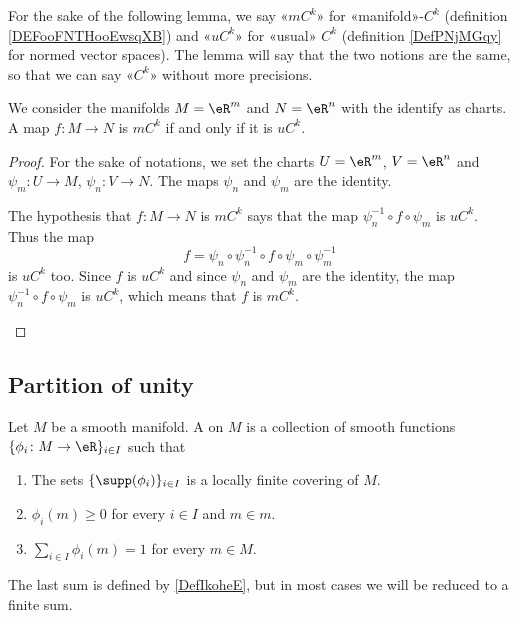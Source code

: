 For the sake of the following lemma, we say «\( mC^k\)» for «manifold»-\( C^k\) (definition \ref{DEFooFNTHooEwsqXB}) and «\( uC^k\)» for «usual» \( C^k\) (definition \ref{DefPNjMGqy} for normed vector spaces). The lemma will say that the two notions are the same, so that we can say «\( C^k\)» without more precisions.
\begin{lemma}			\label{LEMooXGFXooBcmIbK}
	We consider the manifolds \( M=\eR^m\) and \( N=\eR^n\) with the identify as charts. A map \( f\colon M\to N\) is \( mC^k\) if and only if it is \( uC^k\).
\end{lemma}

\begin{proof}
	For the sake of notations, we set the charts \( U=\eR^m\), \( V=\eR^n\) and \( \psi_m\colon U\to M\), \( \psi_n\colon V\to N\). The maps \( \psi_n\) and \( \psi_m\) are the identity.
	\begin{subproof}
		\spitem[\( \Rightarrow\)]
		The hypothesis that \( f\colon M\to N\) is \( mC^k\) says that the map \( \psi_n^{-1}\circ f\circ\psi_m\) is \( uC^k\). Thus the map
		\begin{equation}
			f=\psi_n\circ\psi_n^{-1}\circ f\circ\psi_m\circ\psi_m^{-1}
		\end{equation}
		is \( uC^k\) too.
		\spitem[\( \Leftarrow\)]
		Since \( f\) is \( uC^k\) and since \( \psi_n\) and \( \psi_m\) are the identity, the map \( \psi_n^{-1}\circ f\circ\psi_m\) is \( uC^k\), which means that \( f\) is \( mC^k\).
	\end{subproof}
\end{proof}


\subsection{Partition of unity}

\begin{definition}			\label{DEFooGEAJooInejRf}
	Let \( M\) be a smooth manifold. A  on \( M\) is a collection of smooth functions \( \{\phi_i \colon M\to \eR   \}_{i\in I}\) such that
	\begin{enumerate}
		\item		\label{ITEMooWBHEooSHUQvv}
		      The sets \( \{ \supp(\phi_i) \}_{i\in I}\) is a locally finite covering of \( M\).
		\item		\label{ITEMooSPHGooQSDFTz}
		      \( \phi_i(m)\geq 0\) for every \( i\in I\) and \( m\in m\).
		\item		\label{ITEMooGWGPooOGdAGU}
		      \( \sum_{i\in I}\phi_i(m)=1\) for every \( m\in M\).
	\end{enumerate}
	The last sum is defined by \ref{DefIkoheE}, but in most cases we will be reduced to a finite sum.
\end{definition}

